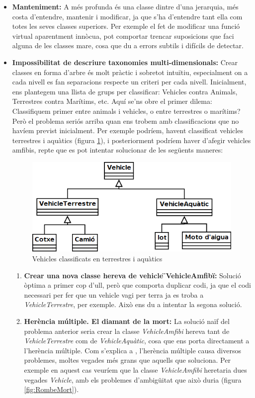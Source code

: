 \begin{itemize}
  \item {\bf Manteniment:} A més profunda és una classe dintre d'una jerarquia, més costa d'entendre, mantenir i modificar, ja que s'ha d'entendre tant ella com totes les seves classes superiors. Per exemple el fet de modificar una funció virtual aparentment innòcua, pot comportar trencar suposicions que faci alguna de les classes mare, cosa que du a errors subtils i difícils de detectar.
    
  \item {\bf Impossibilitat de descriure taxonomies multi-dimensionals:} Crear classes en forma d'arbre és molt pràctic i sobretot intuïtiu, especialment on a cada nivell es fan separacions respecte un criteri per cada nivell. Inicialment, ens plantegem una llista de grups per classificar: Vehicles contra Animals, Terrestres contra Marítims, etc. Aquí se'ns obre el primer dilema: Classifiquem primer entre animals i vehicles, o entre terrestres o marítims? Però el problema seriós arriba quan ens trobem amb classificacions que no havíem previst inicialment. Per exemple podríem, havent classificat vehicles terrestres i aquàtics (figura \ref{fig:Vehicles}), i posteriorment podríem haver d'afegir vehicles amfibis, repte que es pot intentar solucionar de les següents maneres:
  
  \begin{figure}
    \centering
    \includegraphics[width=0.58\linewidth]{./img/Vehicles.png}
    \caption{Vehicles classificats en terrestres i aquàtics \label{fig:Vehicles}}
  \end{figure}
  
    \begin{enumerate}
      \item {\bf Crear una nova classe hereva de vehicle \"{}VehicleAmfibi\"{}:} Solució òptima a primer cop d'ull, però que comporta duplicar codi, ja que el codi necessari per fer que un vehicle vagi per terra ja es troba a {\em VehicleTerrestre}, per exemple. Això ens du a intentar la segona solució.
      
      \item {\bf Herència múltiple. El diamant de la mort:} La solució naïf del problema anterior seria crear la classe {\em VehicleAmfibi} hereva tant de {\em VehicleTerrestre} com de {\em VehicleAquàtic}, cosa que ens porta directament a l'herència múltiple. Com s'explica a \cite[p.~2]{Martin97}, l'herència múltiple causa diversos problemes, moltes vegades més grans que aquells que soluciona. Per exemple en aquest cas veuríem que la classe {\em VehicleAmfibi} heretaria dues vegades {\em Vehicle}, amb els problemes d'ambigüitat que això duria (figura \ref{fig:RombeMort}).
        

\end{enumerate}
\end{itemize}
